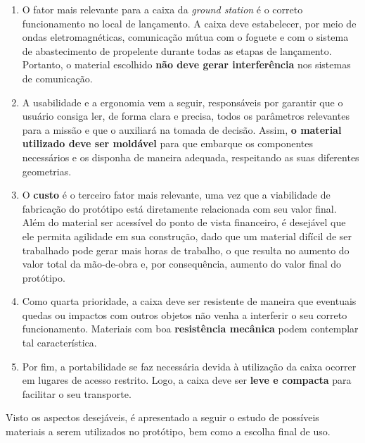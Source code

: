 \begin{enumerate}
    \item O fator mais relevante para a caixa da \textit{ground station} é o correto funcionamento no local de lançamento. A caixa deve estabelecer, por meio de ondas eletromagnéticas, comunicação mútua com o foguete e com o sistema de abastecimento de propelente durante todas as etapas de lançamento. Portanto, o material escolhido \textbf{não deve gerar interferência} nos sistemas de comunicação. 
    \item A usabilidade e a ergonomia vem a seguir, responsáveis por garantir que o usuário consiga ler, de forma clara e precisa, todos os parâmetros relevantes para a missão e que o auxiliará na tomada de decisão. Assim, \textbf{o material utilizado deve ser moldável} para que embarque os componentes necessários e os disponha de maneira adequada, respeitando as suas diferentes geometrias.
    \item O \textbf{custo} é o terceiro fator mais relevante, uma vez que a viabilidade de fabricação do protótipo está diretamente relacionada com seu valor final. Além do material ser acessível do ponto de vista financeiro, é desejável que ele permita agilidade em sua construção, dado que um material difícil de ser trabalhado pode gerar mais horas de trabalho, o que resulta no aumento do valor total da mão-de-obra e, por consequência, aumento do valor final do protótipo.
    \item Como quarta prioridade, a caixa deve ser resistente de maneira que eventuais quedas ou impactos com outros objetos não venha a interferir o seu correto funcionamento. Materiais com boa \textbf{resistência mecânica} podem contemplar tal característica.
    \item Por fim, a portabilidade se faz necessária devida à utilização da caixa ocorrer em lugares de acesso restrito. Logo, a caixa deve ser \textbf{leve e compacta} para facilitar o seu transporte.
\end{enumerate}

\par Visto os aspectos desejáveis, é apresentado a seguir o estudo de possíveis materiais a serem utilizados no protótipo, bem como a escolha final de uso.

